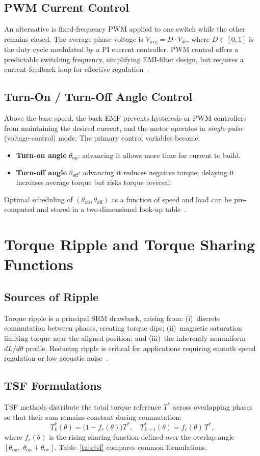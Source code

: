 \documentclass[conference]{IEEEtran}
\begin{document}
\subsection{PWM Current Control}
An alternative is fixed-frequency PWM applied to one switch while the other remains closed.
The average phase voltage is $V_{\mathrm{avg}} = D\cdot V_{dc}$, where $D\in[0,1]$ is the duty
cycle modulated by a PI current controller. PWM control offers a predictable switching
frequency, simplifying EMI-filter design, but requires a current-feedback loop for effective
regulation~\cite{Krishnan2001}.

\subsection{Turn-On / Turn-Off Angle Control}
Above the base speed, the back-EMF prevents hysteresis or PWM controllers from maintaining the
desired current, and the motor operates in \emph{single-pulse} (voltage-control) mode. The
primary control variables become:
\begin{itemize}
\item \textbf{Turn-on angle} $\theta_{\mathrm{on}}$: advancing it allows more time for current to build.
\item \textbf{Turn-off angle} $\theta_{\mathrm{off}}$: advancing it reduces negative torque; delaying it
      increases average torque but risks torque reversal.
\end{itemize}
Optimal scheduling of $(\theta_{\mathrm{on}}, \theta_{\mathrm{off}})$ as a function of speed and
load can be pre-computed and stored in a two-dimensional look-up table~\cite{Miller1993}.

\section{Torque Ripple and Torque Sharing Functions}
\subsection{Sources of Ripple}
Torque ripple is a principal SRM drawback, arising from: (i)~discrete commutation between
phases, creating torque dips; (ii)~magnetic saturation limiting torque near the aligned
position; and (iii)~the inherently nonuniform $dL/d\theta$ profile. Reducing ripple is critical
for applications requiring smooth speed regulation or low acoustic
noise~\cite{Schramm1992,Xue2009}.

\subsection{TSF Formulations}
TSF methods distribute the total torque reference $T^*$ across overlapping phases so that their
sum remains constant during commutation:
\begin{equation}
T_k^*(\theta) = \bigl(1-f_r(\theta)\bigr)T^*,\quad T_{k+1}^*(\theta)=f_r(\theta)\,T^*,
\end{equation}
where $f_r(\theta)$ is the rising sharing function defined over the overlap angle
$[\theta_{\mathrm{on}},\;\theta_{\mathrm{on}}+\theta_{\mathrm{ov}}]$. Table~\ref{tab:tsf}
compares common formulations.
\end{document}
